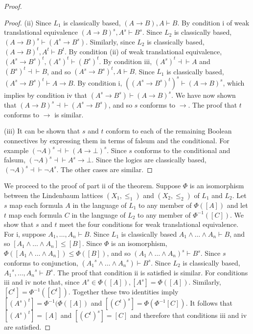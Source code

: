 \documentclass[11pt]{article}
\begin{document}
\begin{proof}
\begin{proof}
(ii) Since $L_1$ is classically based, $(A\rightarrow B),A \vdash B$. By condition i of weak translational equivalence 
$(A\rightarrow B)^s, A^s \vdash B^s$. Since $L_2$ is classically based, $(A\rightarrow B)^s \vdash (A^s\rightarrow B^s)$. Similarly, since $L_2$ is classically based, 
$(A\rightarrow B)^t,A^t \vdash B^t$. By condition (ii) of weak translational equivalence, $(A^s\rightarrow B^s)^t,(A^s)^t \vdash (B^s)^t$. By condition iii, $(A^s)^t {\dashv}{\vdash}A$ and $(B^s)^t {\dashv}{\vdash}B$, and so $(A^s\rightarrow B^s)^t,A \vdash B$. Since $L_1$ is classically based, 
$(A^s\rightarrow B^s)^t \vdash A\rightarrow B$. By condition i, $((A^s\rightarrow B^s)^t)^s \vdash (A\rightarrow B)^s$, which implies by condition iv that $(A^s\rightarrow B^s) \vdash (A\rightarrow B)^s$. We have now shown that $(A\rightarrow B)^s{\dashv}{\vdash}(A^s\rightarrow B^s)$, and so $s$ conforms to $\rightarrow $. The proof that $t$ conforms to $\rightarrow $ is similar.

(iii) It can be shown that $s$ and $t$ conform to each of the remaining Boolean connectives by expressing them in terms of falsum and the conditional. For example $(\neg A)^s {\dashv}{\vdash} (A\rightarrow \bot)^s$. Since $s$ conforms to the conditional and falsum, $(\neg A)^s {\dashv}{\vdash} A^s \rightarrow \bot$. Since the logics are classically based, 
$(\neg A)^s {\dashv}{\vdash} \neg A^s$. The other cases are similar.
\end{proof}
We proceed to the proof of part ii of the theorem. Suppose $\Phi$ is an isomorphism between the Lindenbaum lattices $(X_1,\le _1)$ and $(X_2,\le _2)$ of $L_1$ and $L_2$. Let $s$ map each formula $A$ in the language of $L_1$ to any member of $\Phi([A])$ and let $t$ map each formula $C$ in the language of $L_2$ to any member of $\Phi^{-1}([C])$. We show that $s$ and $t$ meet the four conditions for weak translational equivalence. 
For i, suppose $A_1,{\ldots},A_n \vdash B$. Since $L_1$ is classically based $A_1\wedge {\ldots}\wedge A_n \vdash B$, and so $[A_1\wedge {\ldots}\wedge A_n] \le [B]$. Since $\Phi$ is an isomorphism, $\Phi([A_1\wedge {\ldots}\wedge A_n]) \le \Phi([B])$, and so $(A_1\wedge {\ldots}\wedge A_n)^s \vdash B^s$. Since $s$ conforms to conjunction, $({A_1}^s\wedge {\ldots}\wedge {A_n}^s) \vdash B^s$. Since $L_2$ is classically based, ${A_1}^s,{\ldots},{A_n}^s \vdash B^s$. The proof that condition ii is satisfied is similar. For conditions iii and iv note that, since $A^s \in \Phi([A]), [A^s]= \Phi([A])$. Similarly, $[C^t]= \Phi^{-1}([C^t])$. Together these two identities imply $[(A^s)^t] = \Phi^{-1}(\Phi([A])$ and $[(C^t)^s]= \Phi(\Phi^{-1}[C])$. It follows that $[(A^s)^t] = [A]$ and $[(C^t)^s]=[C]$ and therefore that conditions iii and iv are satisfied. 
\end{proof}
\end{document}
